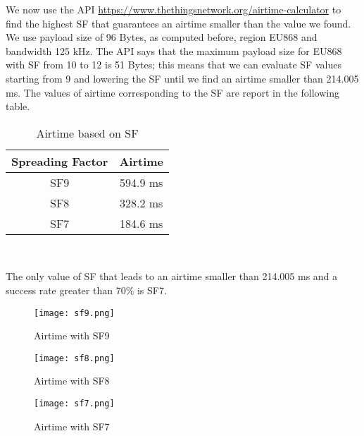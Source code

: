 We now use the API \url{https://www.thethingsnetwork.org/airtime-calculator} to find the highest SF that guarantees an airtime smaller than the value we found. We use payload size of 96 Bytes, as computed before, region EU868 and bandwidth 125 kHz. The API says that the maximum payload size for EU868 with SF from 10 to 12 is 51 Bytes; this means that we can evaluate SF values starting from 9 and lowering the SF until we find an airtime smaller than 214.005 ms.
The values of airtime corresponding to the SF are report in the following table.

\begin{table}[H]
\centering 
\begin{tabular}{| c | c |}
	\hline 
	\rowcolor{bluepoli!40}
	\textbf{Spreading Factor} & \textbf{Airtime}\T\B \\
	\hline 
	SF9 & 594.9 ms \T\B\\
	SF8  & 328.2 ms \T\B\\
	SF7 & 184.6 ms \T\B\\
	\hline
\end{tabular}
\\[10pt]
\caption{Airtime based on SF}
\end{table}

The only value of SF that leads to an airtime smaller than 214.005 ms and a success rate greater than 70\% is SF7.

\begin{figure}[H]
    \centering
    \texttt{[image: sf9.png]}
    \caption{Airtime with SF9}
\end{figure}

\begin{figure}[H]
    \centering
    \texttt{[image: sf8.png]}
    \caption{Airtime with SF8}
\end{figure}

\begin{figure}[H]
    \centering
    \texttt{[image: sf7.png]}
    \caption{Airtime with SF7}
\end{figure}




